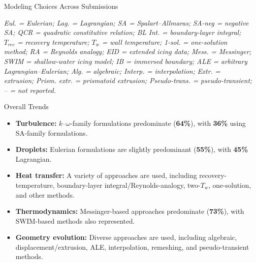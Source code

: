 \begin{frame}{\small Modeling Choices Across Submissions}
\vspace{0.10cm}


\begin{minipage}{0.98\textwidth}
\tiny
\textit{
Eul. = Eulerian;
Lag. = Lagrangian;
SA = Spalart--Allmaras;
SA-neg = negative SA;
QCR = quadratic constitutive relation;
BL Int. = boundary-layer integral;
$T_{rec}$ = recovery temperature;
$T_w$ = wall temperature;
1-sol. = one-solution method;
RA = Reynolds analogy;
EID = extended icing data;
Mess. = Messinger;
SWIM = shallow-water icing model;
IB = immersed boundary;
ALE = arbitrary Lagrangian--Eulerian;
Alg. = algebraic;
Interp. = interpolation;
Extr. = extrusion;
Prism. extr. = prismatoid extrusion;
Pseudo-trans. = pseudo-transient;
-- = not reported.
}
\end{minipage}

\vspace{-0.05cm}

\begin{block}{\scriptsize Overall Trends}
\begin{itemize}

    \item \textbf{Turbulence:}
    $k$--$\omega$-family formulations predominate (\textbf{64\%}),
    with \textbf{36\%} using SA-family formulations.

    \item \textbf{Droplets:}
    Eulerian formulations are slightly predominant (\textbf{55\%}),
    with \textbf{45\%} Lagrangian.

    \item \textbf{Heat transfer:}
    A variety of approaches are used, including recovery-temperature,
    boundary-layer integral/Reynolds-analogy, two-$T_w$, one-solution,
    and other methods.

    \item \textbf{Thermodynamics:}
    Messinger-based approaches predominate (\textbf{73\%}), with
    SWIM-based methods also represented.

    \item \textbf{Geometry evolution:}
    Diverse approaches are used, including algebraic,
    displacement/extrusion, ALE, interpolation, remeshing,
    and pseudo-transient methods.


\end{itemize}
\end{block}
\end{frame}
